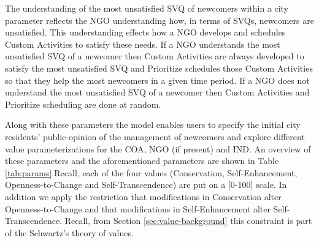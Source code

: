 \documentclass{scspaperproc}
\theoremstyle{scsthe}
\begin{document}
The understanding of the most unsatisfied SVQ of newcomers within a city parameter reflects the NGO understanding how, in terms of SVQs, newcomers are unsatisfied. This understanding effects how a NGO develops and schedules Custom Activities to satisfy these needs. If a NGO understands the most unsatisfied SVQ of a newcomer then Custom Activities are always developed to satisfy the most unsatisfied SVQ and Prioritize schedules those Custom Activities so that they help the most newcomers in a given time period. If a NGO does not understand the most unsatisfied SVQ of a newcomer then Custom Activities and Prioritize scheduling are done at random.

Along with these parameters the model enables users to specify the initial city residents' public-opinion of the management of newcomers and explore different value parameterizations for the COA, NGO (if present) and IND. An overview of these parameters and the aforementioned parameters are shown in Table \ref{tab:params}.Recall, each of the four values (Conservation, Self-Enhancement, Openness-to-Change and Self-Transcendence) are put on a [0-100] scale. In addition we apply the restriction that modifications in Conservation alter Openness-to-Change and that modifications in Self-Enhancement alter Self-Transcendence. Recall, from Section \ref{sec:value-background} this constraint is part of the Schwartz's theory of values.
\end{document}
